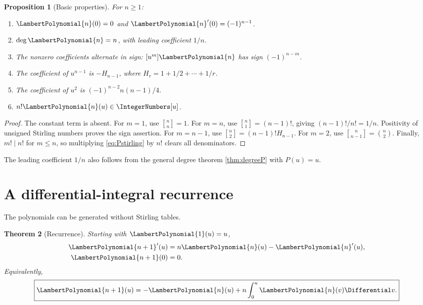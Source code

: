 \documentclass[11pt,oneside,openany]{book}
\newtheorem{theorem}{Theorem}[chapter]
\newtheorem{proposition}[theorem]{Proposition}
\newcommand{\UnsignedStirlingFirstKind}[2]{%
  \genfrac{[}{]}{0pt}{}{#1}{#2}%
}
\begin{document}
\begin{proposition}[Basic properties]\label{prop:Pproperties}
For \(n\geq1\):
\begin{enumerate}
\item \(\LambertPolynomial{n}(0)=0\) and \(\LambertPolynomial{n}'(0)=(-1)^{n-1}\).
\item \(\deg \LambertPolynomial{n}=n\), with leading coefficient \(1/n\).
\item The nonzero coefficients alternate in sign:
\([u^m]\LambertPolynomial{n}\) has sign \((-1)^{n-m}\).
\item The coefficient of \(u^{n-1}\) is \(-H_{n-1}\), where
\(H_r=1+1/2+\cdots+1/r\).
\item The coefficient of \(u^2\) is
\((-1)^{n-2}n(n-1)/4\).
\item \(n!\LambertPolynomial{n}(u)\in\IntegerNumbers[u]\).
\end{enumerate}
\end{proposition}

\begin{proof}
The constant term is absent.  For \(m=1\), use
\(\UnsignedStirlingFirstKind{n}{n}=1\).  For \(m=n\), use
\(\UnsignedStirlingFirstKind{n}{1}=(n-1)!\), giving \((n-1)!/n!=1/n\).
Positivity of unsigned Stirling numbers proves the sign assertion.  For
\(m=n-1\), use
\(\UnsignedStirlingFirstKind{n}{2}=(n-1)!H_{n-1}\).  For \(m=2\), use
\(\UnsignedStirlingFirstKind{n}{n-1}=\binom n2\).  Finally, \(m!\mid n!\) for \(m\leq n\),
so multiplying \cref{eq:Pstirling} by \(n!\) clears all denominators.
\end{proof}

The leading coefficient \(1/n\) also follows from the general degree theorem
\cref{thm:degreeP} with \(P(u)=u\).

\section{A differential-integral recurrence}
The polynomials can be generated without Stirling tables.

\begin{theorem}[Recurrence]\label{thm:Precurrence}
Starting with \(\LambertPolynomial{1}(u)=u\),
\begin{align}
 \LambertPolynomial{n+1}'(u)&=n\LambertPolynomial{n}(u)-\LambertPolynomial{n}'(u),
 \label{eq:Pderivrec}\\
 \LambertPolynomial{n+1}(0)&=0.
 \label{eq:Pzero}
\end{align}
Equivalently,
\begin{equation}\label{eq:Pintegralrec}
 \boxed{
 \LambertPolynomial{n+1}(u)=-\LambertPolynomial{n}(u)+n\int_0^u\LambertPolynomial{n}(v)\Differential v.
 }
\end{equation}
\end{theorem}
\end{document}
